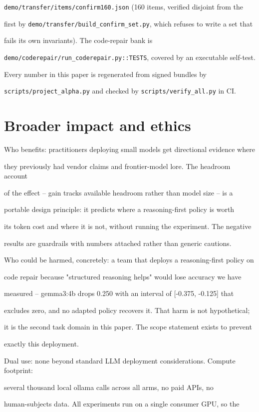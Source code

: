 \documentclass[11pt]{article}
\begin{document}
\texttt{demo/transfer/items/confirm160.json} (160 items, verified disjoint from the

first by \texttt{demo/transfer/build\_confirm\_set.py}, which refuses to write a set that

fails its own invariants). The code-repair bank is

\texttt{demo/coderepair/run\_coderepair.py::TESTS}, covered by an executable self-test.

Every number in this paper is regenerated from signed bundles by

\texttt{scripts/project\_alpha.py} and checked by \texttt{scripts/verify\_all.py} in CI.


\section*{Broader impact and ethics}

Who benefits: practitioners deploying small models get directional evidence where

they previously had vendor claims and frontier-model lore. The headroom account

of the effect -- gain tracks available headroom rather than model size -- is a

portable design principle: it predicts where a reasoning-first policy is worth

its token cost and where it is not, without running the experiment. The negative

results are guardrails with numbers attached rather than generic cautions.


Who could be harmed, concretely: a team that deploys a reasoning-first policy on

code repair because "structured reasoning helps" would lose accuracy we have

measured -- gemma3:4b drops 0.250 with an interval of [-0.375, -0.125] that

excludes zero, and no adapted policy recovers it. That harm is not hypothetical;

it is the second task domain in this paper. The scope statement exists to prevent

exactly this deployment.


Dual use: none beyond standard LLM deployment considerations. Compute footprint:

several thousand local ollama calls across all arms, no paid APIs, no

human-subjects data. All experiments run on a single consumer GPU, so the
\end{document}
